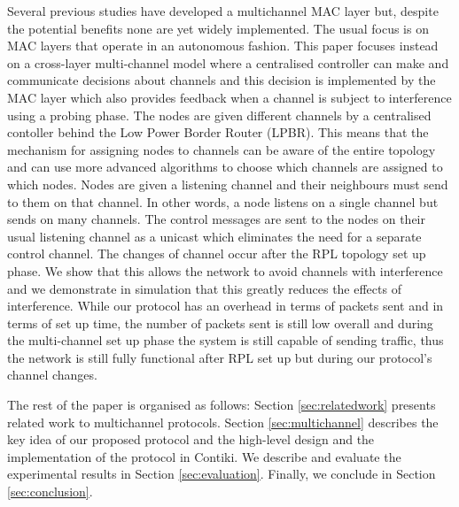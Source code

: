 Several previous studies have developed a multichannel MAC layer but, despite the potential benefits none are yet widely implemented.  The usual focus
is on MAC layers that operate in an autonomous fashion.  This paper focuses instead on a cross-layer multi-channel model where a centralised controller can make and communicate decisions about channels and this decision is implemented by the MAC layer which also provides feedback when a channel is subject to interference using a probing phase. The nodes are given different channels by a centralised contoller behind the Low Power Border Router (LPBR).  This means that the mechanism for assigning nodes to channels can be aware of the entire topology and can use more advanced algorithms to choose which channels are assigned to which nodes.  Nodes are given a listening channel and their neighbours must send to them on
that channel.  In other words, a node listens on a single channel but sends on many channels.
The control messages are sent to the nodes on their usual listening channel as a unicast which eliminates the need for a separate control channel.
The changes of channel occur after the RPL topology set up phase.  We show that this allows the network to avoid channels with interference and we
demonstrate in simulation that this greatly reduces the effects of interference.  While our protocol has an overhead in terms of packets sent and in terms of set up time, the number of packets sent is still low overall and during the multi-channel set up phase the system is still capable of
sending traffic, thus the network is still fully functional after RPL set up but during our protocol's channel changes.

The rest of the paper is organised as follows: Section \ref{sec:relatedwork} presents related work to multichannel protocols. Section \ref{sec:multichannel} describes the key idea of our proposed protocol and the high-level design and the implementation of the protocol in Contiki. We describe and evaluate the experimental results in Section \ref{sec:evaluation}. Finally, we conclude in Section \ref{sec:conclusion}.

%
